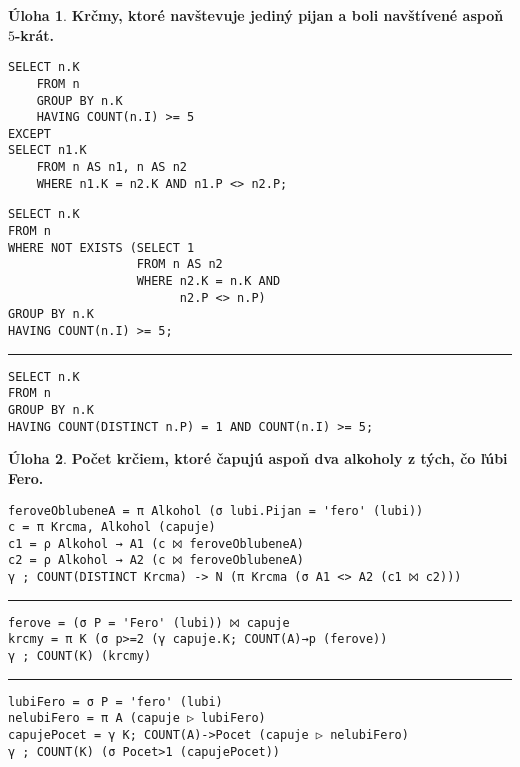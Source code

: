 \documentclass[10pt, a4paper]{article}
\theoremstyle{definition}
\newtheorem{problem}{Úloha}[section]
\def\hr{
    \bigskip
    \hrule
    \bigskip
}
\begin{document}
\begin{problem}
{\bf Krčmy, ktoré navštevuje jediný pijan a boli navštívené aspoň $5$-krát.}\\[5mm]
\begin{minipage}{0.49\textwidth}
\begin{verbatim}
SELECT n.K
    FROM n
    GROUP BY n.K
    HAVING COUNT(n.I) >= 5
EXCEPT
SELECT n1.K
    FROM n AS n1, n AS n2
    WHERE n1.K = n2.K AND n1.P <> n2.P;
\end{verbatim}
\end{minipage}
\begin{minipage}{0.49\textwidth}
\begin{verbatim}
SELECT n.K
FROM n
WHERE NOT EXISTS (SELECT 1
                  FROM n AS n2
                  WHERE n2.K = n.K AND
                        n2.P <> n.P)
GROUP BY n.K
HAVING COUNT(n.I) >= 5;
\end{verbatim}
\end{minipage}

\hr

\begin{minipage}{\textwidth}
\begin{verbatim}
SELECT n.K
FROM n
GROUP BY n.K
HAVING COUNT(DISTINCT n.P) = 1 AND COUNT(n.I) >= 5;
\end{verbatim}
\end{minipage}
\end{problem}



\begin{problem}
{\bf Počet krčiem, ktoré čapujú aspoň dva alkoholy z tých, čo ľúbi Fero.}

\begin{verbatim}
feroveOblubeneA = π Alkohol (σ lubi.Pijan = 'fero' (lubi))
c = π Krcma, Alkohol (capuje)
c1 = ρ Alkohol → A1 (c ⨝ feroveOblubeneA)
c2 = ρ Alkohol → A2 (c ⨝ feroveOblubeneA)
γ ; COUNT(DISTINCT Krcma) -> N (π Krcma (σ A1 <> A2 (c1 ⨝ c2)))
\end{verbatim}

\hr

\begin{verbatim}
ferove = (σ P = 'Fero' (lubi)) ⨝ capuje
krcmy = π K (σ p>=2 (γ capuje.K; COUNT(A)→p (ferove))
γ ; COUNT(K) (krcmy)
\end{verbatim}

\hr

\begin{verbatim}
lubiFero = σ P = 'fero' (lubi)
nelubiFero = π A (capuje ▷ lubiFero)
capujePocet = γ K; COUNT(A)->Pocet (capuje ▷ nelubiFero)
γ ; COUNT(K) (σ Pocet>1 (capujePocet))
\end{verbatim}
\end{problem}
\end{document}
